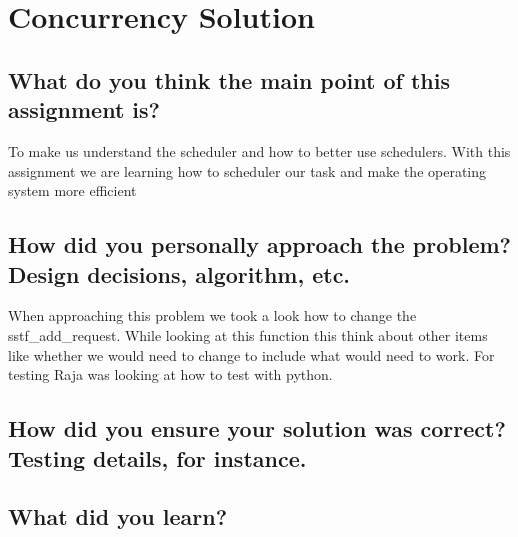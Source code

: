 \documentclass[draftclsnofoot,onecolumn,10pt,compsoc]{IEEEtran}
\begin{document}
\section{Concurrency Solution}
\subsection{What do you think the main point of this assignment is?}
To make us understand the scheduler and how to better use schedulers.  With this assignment we are learning how to scheduler our task and make the operating system more efficient 
\subsection{How did you personally approach the problem? Design decisions, algorithm, etc.}
When approaching this problem we took a look how to change the sstf\_add\_request.  While looking at this function this think about other items like whether we would need to change to include what would need to work.  For testing Raja was looking at how to test with python.
\subsection{How did you ensure your solution was correct? Testing details, for instance.}

\subsection{What did you learn?}
\end{document}
